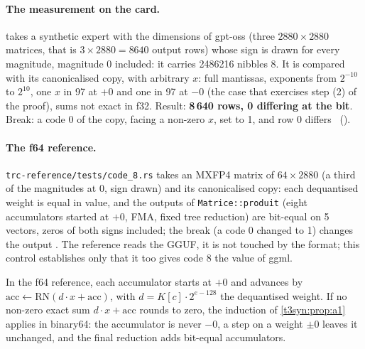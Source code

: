 \begin{figure}[tbp]
\centering
\GrapheCodonAccumulateur
{}
\label{fig:t3-codon-accumulateur}
\end{figure}

\paragraph{The measurement on the card.}  takes a synthetic expert with the dimensions of gpt-oss (three $2880 \times 2880$ matrices, that is $3 \times 2880 = 8640$ output rows) whose sign is drawn for every magnitude, magnitude 0 included: it carries \num{2486216} nibbles 8. It is compared with its canonicalised copy, with arbitrary $x$: full mantissas, exponents from $2^{-10}$ to $2^{10}$, one $x$ in 97 at $+0$ and one in 97 at $-0$ (the case that exercises step (2) of the proof), sums not exact in f32. Result: \textbf{8\,640 rows, 0 differing at the bit}. Break: a code 0 of the copy, facing a non-zero $x$, set to 1, and row 0 differs \mes~().

\paragraph{The f64 reference.} \texttt{trc-reference/tests/code\_8.rs} takes an MXFP4 matrix of $64 \times 2880$ (a third of the magnitudes at 0, sign drawn) and its canonicalised copy: each dequantised weight is equal in value, and the outputs of \texttt{Matrice::produit} (eight accumulators started at $+0$, FMA, fixed tree reduction) are bit-equal on 5 vectors, zeros of both signs included; the break (a code 0 changed to 1) changes the output \mes. The reference reads the GGUF, it is not touched by the format; this control establishes only that it too gives code 8 the value of ggml.

\begin{corollaire}\label{t3cod:cor:f64}
In the f64 reference, each accumulator starts at $+0$ and advances by $\mathrm{acc} \leftarrow \mathrm{RN}(d \cdot x + \mathrm{acc})$, with $d = K[c] \cdot 2^{e-128}$ the dequantised weight. If no non-zero exact sum $d\cdot x + \mathrm{acc}$ rounds to zero, the induction of \cref{t3syn:prop:a1} applies in binary64: the accumulator is never $-0$, a step on a weight $\pm 0$ leaves it unchanged, and the final reduction adds bit-equal accumulators.
\end{corollaire}

